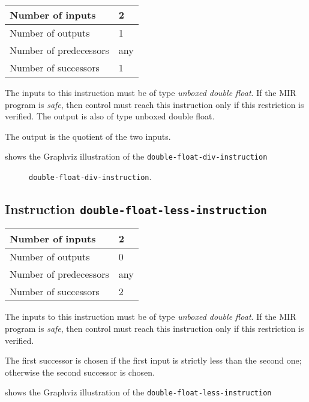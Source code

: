 \begin{tabular}{|l|l|}
\hline
Number of inputs & 2\\
\hline
Number of outputs & 1\\
\hline
Number of predecessors & any\\
\hline
Number of successors & 1\\
\hline
\end{tabular}

The inputs to this instruction must be of type \emph{unboxed double
  float}.  If the MIR program is \emph{safe}, then control must reach
this instruction only if this restriction is verified.  The output is
also of type unboxed double float.

The output is the quotient of the two inputs.

 shows the Graphviz illustration of the
\texttt{double-float-div-instruction}

\begin{figure}
\begin{center}
\end{center}
\caption{\label{fig-double-float-div-instruction}
\texttt{double-float-div-instruction}.}
\end{figure}

\subsection{Instruction \texttt{double-float-less-instruction}}
\label{mir-instruction-double-float-less}

\begin{tabular}{|l|l|}
\hline
Number of inputs & 2\\
\hline
Number of outputs & 0\\
\hline
Number of predecessors & any\\
\hline
Number of successors & 2\\
\hline
\end{tabular}

The inputs to this instruction must be of type \emph{unboxed double
  float}.  If the MIR program is \emph{safe}, then control must reach
this instruction only if this restriction is verified.

The first successor is chosen if the first input is strictly less than
the second one; otherwise the second successor is chosen. 

 shows the Graphviz illustration of the
\texttt{double-float-less-instruction}

